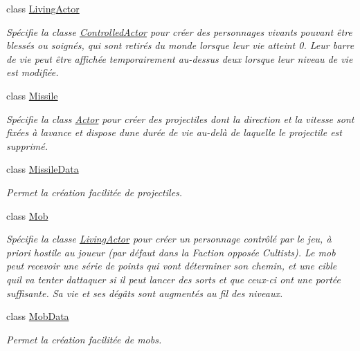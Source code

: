 \begin{DoxyCompactItemize}
class \hyperlink{class_tentacle_slicers_1_1actors_1_1_living_actor}{Living\+Actor}
\begin{DoxyCompactList}\small\item\em Spécifie la classe \hyperlink{class_tentacle_slicers_1_1actors_1_1_controlled_actor}{Controlled\+Actor} pour créer des personnages vivants pouvant être blessés ou soignés, qui sont retirés du monde lorsque leur vie atteint 0. Leur barre de vie peut être affichée temporairement au-\/dessus d\textquotesingle{}eux lorsque leur niveau de vie est modifiée. \end{DoxyCompactList}\item 
class \hyperlink{class_tentacle_slicers_1_1actors_1_1_missile}{Missile}
\begin{DoxyCompactList}\small\item\em Spécifie la class \hyperlink{class_tentacle_slicers_1_1actors_1_1_actor}{Actor} pour créer des projectiles dont la direction et la vitesse sont fixées à l\textquotesingle{}avance et dispose d\textquotesingle{}une durée de vie au-\/delà de laquelle le projectile est supprimé. \end{DoxyCompactList}\item 
class \hyperlink{class_tentacle_slicers_1_1actors_1_1_missile_data}{Missile\+Data}
\begin{DoxyCompactList}\small\item\em Permet la création facilitée de projectiles. \end{DoxyCompactList}\item 
class \hyperlink{class_tentacle_slicers_1_1actors_1_1_mob}{Mob}
\begin{DoxyCompactList}\small\item\em Spécifie la classe \hyperlink{class_tentacle_slicers_1_1actors_1_1_living_actor}{Living\+Actor} pour créer un personnage contrôlé par le jeu, à priori hostile au joueur (par défaut dans la Faction opposée Cultists). Le mob peut recevoir une série de points qui vont déterminer son chemin, et une cible qu\textquotesingle{}il va tenter d\textquotesingle{}attaquer si il peut lancer des sorts et que ceux-\/ci ont une portée suffisante. Sa vie et ses dégâts sont augmentés au fil des niveaux. \end{DoxyCompactList}\item 
class \hyperlink{class_tentacle_slicers_1_1actors_1_1_mob_data}{Mob\+Data}
\begin{DoxyCompactList}\small\item\em Permet la création facilitée de mobs. \end{DoxyCompactList}\item 

\end{DoxyCompactItemize}
